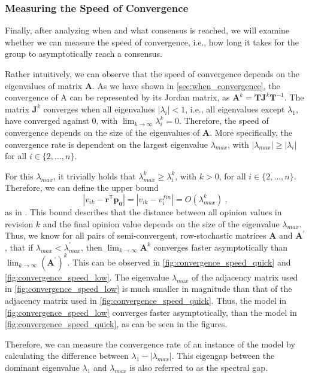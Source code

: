 \documentclass[journal,compsoc,10pt]{IEEEtran}
\newcommand{\T}{\mathsf{T}}            %
\renewcommand{\vec}[1]{\bm{#1}}        %
\newcommand{\mat}[1]{\bm{#1}}          %
\begin{document}
\subsubsection{Measuring the Speed of Convergence}\label{sec:speed_convergence}
Finally, after analyzing when and what consensus is reached, we will examine whether we can measure the speed of convergence, i.e., how long it takes for the group to asymptotically reach a consensus.

Rather intuitively, we can observe that the speed of convergence depends on the eigenvalues of matrix $\mat A$. As we have shown in \cref{sec:when_convergence}, the convergence of A can be represented by its Jordan matrix, as $\mat A^k = \mat T\mat J^k\mat T^{-1}$. The matrix $\mat J^k$ converges when all eigenvalues $|\lambda_i| < 1$, i.e., all eigenvalues except $\lambda_1$, have converged against $0$, with $\lim_{k\rightarrow\infty}\lambda_i^k = 0$. Therefore, the speed of convergence depends on the size of the eigenvalues of $\mat A$. More specifically, the convergence rate is dependent on the largest eigenvalue $\lambda_{max}$, with $|\lambda_{max}| \geq |\lambda_i|$ for all $i \in \{2,\dots,n\}$.

For this $\lambda_{max}$, it trivially holds that $\lambda_{max}^k \geq \lambda_i^k$, with $k > 0$, for all $i\in \{2,\dots,n\}$.
Therefore, we can define the upper bound 
\[|v_{ik} - \vec r^\T \vec{p_0}| = |v_{ik} - v^{fin}_i| = O(\lambda_{max}^k)\ ,\]
as in \cite{DeMarzo}.
This bound describes that the distance between all opinion values in revision $k$ and the final opinion value depends on the size of the eigenvalue $\lambda_{max}$.
Thus, we know for all pairs of semi-convergent, row-stochastic matrices $\mat A$ and $\mat{A^{'}}$, that if $\lambda_{max} < \lambda_{max}^{'}$, then $\lim_{k\rightarrow\infty}\mat A^k$ converges faster asymptotically than $\lim_{k\rightarrow\infty}(\mat{A^{'}})^k$. 
This can be observed in \cref{fig:convergence_speed_quick} and \cref{fig:convergence_speed_low}. The eigenvalue $\lambda_{max}$ of the adjacency matrix used in \cref{fig:convergence_speed_low} is much smaller in magnitude than that of the adjacency matrix used in \cref{fig:convergence_speed_quick}. Thus, the model in \cref{fig:convergence_speed_low} converges faster asymptotically, than the model in \cref{fig:convergence_speed_quick}, as can be seen in the figures.

Therefore, we can measure the convergence rate of an instance of the model by calculating the difference between $\lambda_1 - |\lambda_{max}|$. This eigengap between the dominant eigenvalue $\lambda_1$ and $\lambda_{max}$ is also referred to as the spectral gap. 
\end{document}
